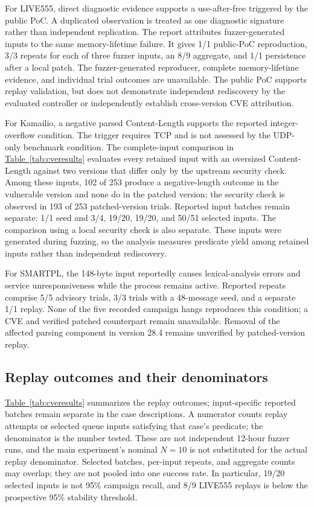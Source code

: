 \documentclass[final,5p,times,number]{elsarticle}
\newcommand{\namedref}[2]{\hyperref[#2]{#1~\ref*{#2}}}
\begin{document}
For LIVE555, direct diagnostic evidence supports a use-after-free triggered by the public PoC. A duplicated observation is treated as one diagnostic signature rather than independent replication. The report attributes fuzzer-generated inputs to the same memory-lifetime failure. It gives 1/1 public-PoC reproduction, 3/3 repeats for each of three fuzzer inputs, an 8/9 aggregate, and 1/1 persistence after a local patch. The fuzzer-generated reproducer, complete memory-lifetime evidence, and individual trial outcomes are unavailable. The public PoC supports replay validation, but does not demonstrate independent rediscovery by the evaluated controller or independently establish cross-version CVE attribution.

For Kamailio, a negative parsed Content-Length supports the reported integer-overflow condition. The trigger requires TCP and is not assessed by the UDP-only benchmark condition. The complete-input comparison in \namedref{Table}{tab:cveresults} evaluates every retained input with an oversized Content-Length against two versions that differ only by the upstream security check. Among these inputs, 102 of 253 produce a negative-length outcome in the vulnerable version and none do in the patched version; the security check is observed in 193 of 253 patched-version trials. Reported input batches remain separate: 1/1 seed and 3/4, 19/20, 19/20, and 50/51 selected inputs. The comparison using a local security check is also separate. These inputs were generated during fuzzing, so the analysis measures predicate yield among retained inputs rather than independent rediscovery.

For SMARTPL, the 148-byte input reportedly causes lexical-analysis errors and service unresponsiveness while the process remains active. Reported repeats comprise 5/5 advisory trials, 3/3 trials with a 48-message seed, and a separate 1/1 replay. None of the five recorded campaign hangs reproduces this condition; a CVE and verified patched counterpart remain unavailable. Removal of the affected parsing component in version 28.4 remains unverified by patched-version replay.

\subsection{Replay outcomes and their denominators}
\namedref{Table}{tab:cveresults} summarizes the replay outcomes; input-specific reported batches remain separate in the case descriptions. A numerator counts replay attempts or selected queue inputs satisfying that case's predicate; the denominator is the number tested. These are not independent 12-hour fuzzer runs, and the main experiment's nominal $N=10$ is not substituted for the actual replay denominator. Selected batches, per-input repeats, and aggregate counts may overlap; they are not pooled into one success rate. In particular, 19/20 selected inputs is not 95\% campaign recall, and 8/9 LIVE555 replays is below the prospective 95\% stability threshold.
\end{document}
